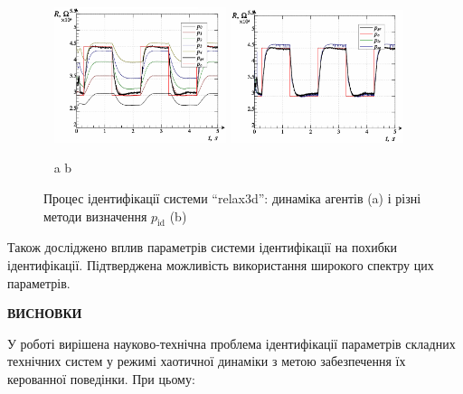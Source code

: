 \documentclass[a4paper,13pt]{atuaref}
\newcommand{\xsect}[1]{\medskip\begin{center}\textbf{#1}\end{center}\medskip\penalty10000}
\begin{document}
\begin{figure}[htb!]
  \centerline{
    ~ \hfill
    \includegraphics[width=0.45\textwidth]{p7/p/relax3d_read_id2-p_p_00_xl.png}
    \hfill
    \includegraphics[width=0.45\textwidth]{p7/p/relax3d_read_id2-p_pp_00_xl.png}
    \hfill ~
  }
  \vspace{-1.7ex}
  \begin{center}
    ~ \hfill a \hfill\hfill b \hfill ~
  \end{center}
  \vspace{-2.7ex}
  \caption{Процес ідентифікації системи ``relax3d'':
  динаміка агентів (a) і різні методи визначення $p_\mathrm{id}$ (b)}
  \label{atu:f:relax3d_id_1}
\end{figure}

Також досліджено вплив параметрів системи ідентифікації на похибки ідентифікації.
Підтверджена можливість використання широкого спектру цих параметрів.



\xsect{ВИСНОВКИ}

У роботі вирішена науково-технічна проблема ідентифікації параметрів складних технічних
систем у режимі хаотичної динаміки
з метою забезпечення їх керованної поведінки. При цьому:
\end{document}
